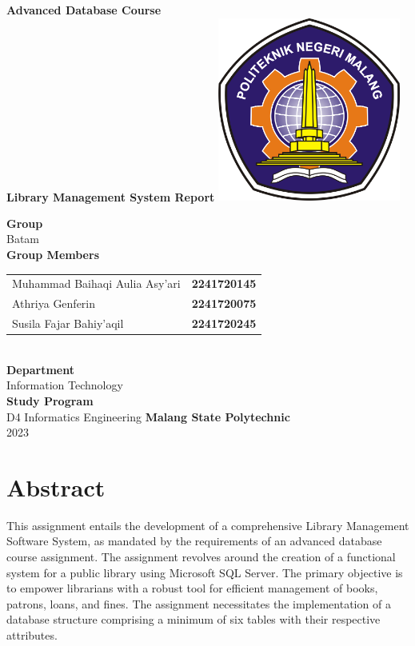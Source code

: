 \documentclass[12pt,titlepage,a4paper]{report}
\newcommand{\vSubject}{Advanced Database Course}
\newcommand{\vSubtitle}{Library Management System Report}
\newcommand{\vGroup}{Batam}
\newcommand{\vDepartment}{Information Technology}
\newcommand{\vStudyProgram}{D4 Informatics Engineering}
\begin{document}
\begin{titlepage}
    \centering
    \vfill
    {\bfseries\LARGE
        \vSubject\\
        \vskip0.25cm
        \vSubtitle
    }
    \vfill
    \includegraphics[width=6cm]{images/polinema-logo.png}
    \vfill
    {
        \textbf{Group}\\
        \vGroup\\
        \vspace{0.5cm}
        \textbf{Group Members}\\
        \vspace{0.5cm}
        \begin{tabular}{l l}
            Muhammad Baihaqi Aulia Asy'ari  & \textbf{2241720145} \\
            Athriya Genferin                & \textbf{2241720075} \\
            Susila Fajar Bahiy'aqil         & \textbf{2241720245} \\            
        \end{tabular}
        \\
        \vspace{0.5cm}
        \textbf{Department}\\
        \vDepartment\\
        \vskip0.5cm
        \textbf{Study Program}\\
        \vStudyProgram
        \vskip0.5cm
        \textbf{Malang State Polytechnic}\\
        2023
    }
\end{titlepage}

\newpage

\section{Abstract}
This assignment entails the development of a comprehensive Library Management Software System, as mandated by the requirements of an advanced database course assignment. The assignment revolves around the creation of a functional system for a public library using Microsoft SQL Server. The primary objective is to empower librarians with a robust tool for efficient management of books, patrons, loans, and fines. The assignment necessitates the implementation of a database structure comprising a minimum of six tables with their respective attributes.
\end{document}
